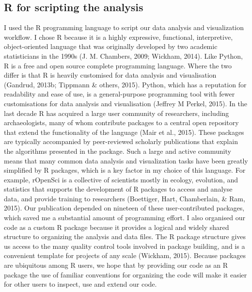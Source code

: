 \documentclass[american,man]{apa6}
\begin{document}
\subsection{R for scripting the
analysis}\label{r-for-scripting-the-analysis}

I used the R programming language to script our data analysis and
visualization workflow. I chose R because it is a highly expressive,
functional, interpretive, object-oriented language that was originally
developed by two academic statisticians in the 1990s (J. M. Chambers,
2009; Wickham, 2014). Like Python, R is a free and open source complete
programming language. Where the two differ is that R is heavily
customised for data analysis and visualisation (Gandrud, 2013b; Tippmann
\& others, 2015). Python, which has a reputation for readability and
ease of use, is a general-purpose programming tool with fewer
customisations for data analysis and visualisation (Jeffrey M Perkel,
2015). In the last decade R has acquired a large user community of
researchers, including archaeologists, many of whom contribute packages
to a central open repository that extend the functionality of the
language (Mair et al., 2015). These packages are typically accompanied
by peer-reviewed scholarly publications that explain the algorithms
presented in the package. Such a large and active community means that
many common data analysis and visualization tasks have been greatly
simplified by R packages, which is a key factor in my choice of this
language. For example, rOpenSci is a collective of scientists mostly in
ecology, evolution, and statistics that supports the development of R
packages to access and analyse data, and provide training to researchers
(Boettiger, Hart, Chamberlain, \& Ram, 2015). Our publication depended
on nineteen of these user-contributed packages, which saved me a
substantial amount of programming effort. I also organised our code as a
custom R package because it provides a logical and widely shared
structure to organizing the analysis and data files. The R package
structure gives us access to the many quality control tools involved in
package building, and is a convenient template for projects of any scale
(Wickham, 2015). Because packages are ubiquitous among R users, we hope
that by providing our code as an R package the use of familiar
conventions for organizing the code will make it easier for other users
to inspect, use and extend our code.
\end{document}

